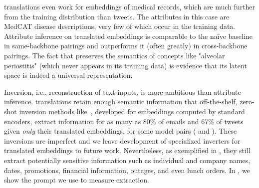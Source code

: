 \label{sec:mimic_classification}
\atk{} translations even work for embeddings of medical records, which are much further from the training distribution than tweets.  The attributes in this case are MedCAT disease descriptions, very few of which occur in the training data.  Attribute inference on translated embeddings is comparable to the naïve baseline in same-backbone pairings and outperforms it (often greatly) in cross-backbone pairings.  The fact that \atk{} preserves the semantics of concepts like "alveolar periostitis" (which never appears in its training data) is evidence that its latent space is indeed a universal representation.




Inversion, i.e., reconstruction of text inputs, is more ambitious than attribute inference.  \atk{} translations retain enough semantic information that off-the-shelf, zero-shot inversion methods like~\cite{zhang2025universalzeroshotembeddinginversion}, developed for embeddings computed by standard encoders, extract information for as many as 80\% of emails and 67\% of tweets given \emph{only} their translated embeddings, for some model pairs ( and ).  These inversions are imperfect and we leave development of specialized inverters for translated embeddings to future work.  Nevertheless, as exemplified in , they still extract potentially sensitive information such as individual and company names, dates, promotions, financial information, outages, and even lunch orders. In , we show the prompt we use to measure extraction.

